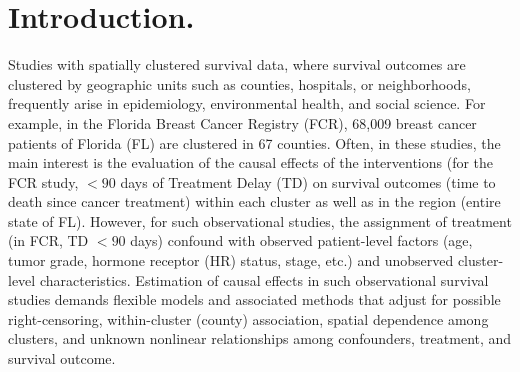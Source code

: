 \documentclass[aoas]{imsart}
\theoremstyle{plain}
\theoremstyle{definition}
\begin{document}


\section{Introduction.}
Studies with spatially clustered survival data, where survival outcomes are clustered by geographic units such as counties, hospitals, or neighborhoods, frequently arise in epidemiology, environmental health, and social science. 
For example, in the Florida Breast Cancer Registry (FCR), 68,009 breast cancer patients of Florida (FL)  are clustered in 67 counties. 
Often, in these studies, the main interest is the evaluation of the
causal effects of the interventions (for the FCR study, $<90$ days of Treatment Delay (TD) on survival outcomes (time to death since cancer treatment) within each cluster as well as in the region (entire state of FL). 
However, for such observational studies, the assignment of treatment (in FCR, TD $<90$ days) confound with observed  patient-level factors (age, tumor grade, hormone receptor (HR) status, stage, etc.) and unobserved cluster-level characteristics. Estimation of causal effects in such observational survival studies demands flexible models and associated methods that adjust for possible right-censoring, within-cluster (county) association, spatial dependence among clusters, and unknown nonlinear relationships among confounders, treatment, and survival outcome.

\end{document}
